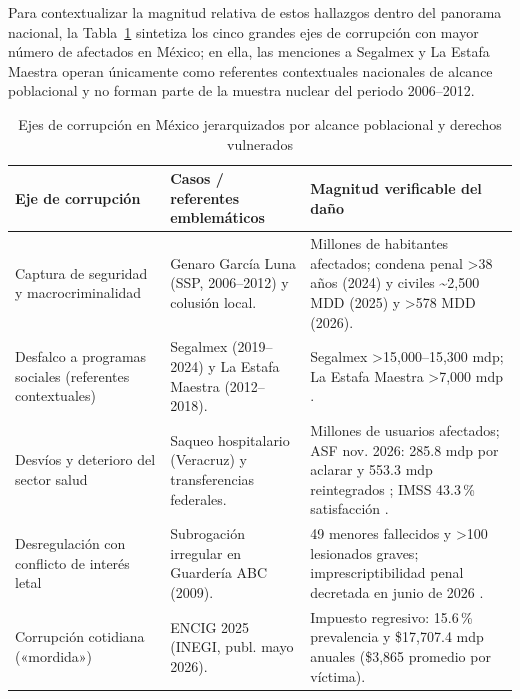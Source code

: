 \documentclass[12pt,letterpaper,oneside]{article}
\begin{document}
Para contextualizar la magnitud relativa de estos hallazgos dentro del panorama nacional, la Tabla~\ref{tab:ejes} sintetiza los cinco grandes ejes de corrupción con mayor número de afectados en México; en ella, las menciones a Segalmex y La Estafa Maestra operan únicamente como referentes contextuales nacionales de alcance poblacional y no forman parte de la muestra nuclear del periodo 2006--2012.

\begin{table}[H]
\centering
\caption{Ejes de corrupción en México jerarquizados por alcance poblacional y derechos vulnerados}
\label{tab:ejes}
\small
\begin{tabular}{@{}p{3.5cm}p{4cm}p{5.5cm}@{}}
\toprule
\textbf{Eje de corrupción} & \textbf{Casos / referentes emblemáticos} & \textbf{Magnitud verificable del daño} \\
\midrule
Captura de seguridad y macrocriminalidad & Genaro García Luna (SSP, 2006--2012) y colusión local. & Millones de habitantes afectados; condena penal >38 años (2024) y civiles \textasciitilde2,500 MDD (2025) y >578 MDD (2026). \\
\addlinespace
Desfalco a programas sociales (referentes contextuales) & Segalmex (2019--2024) y La Estafa Maestra (2012--2018). & Segalmex >15,000--15,300 mdp; La Estafa Maestra >7,000 mdp \citep{perez2024,mccitablero}. \\
\addlinespace
Desvíos y deterioro del sector salud & Saqueo hospitalario (Veracruz) y transferencias federales. & Millones de usuarios afectados; ASF nov. 2026: 285.8 mdp por aclarar y 553.3 mdp reintegrados \citep{ramos2026}; IMSS 43.3\,\% satisfacción \citep{inegi2026}. \\
\addlinespace
Desregulación con conflicto de interés letal & Subrogación irregular en Guardería ABC (2009). & 49 menores fallecidos y >100 lesionados graves; imprescriptibilidad penal decretada en junio de 2026 \citep{nunez2026}. \\
\addlinespace
Corrupción cotidiana («mordida») & ENCIG 2025 (INEGI, publ. mayo 2026). & Impuesto regresivo: 15.6\,\% prevalencia y \$17,707.4 mdp anuales (\$3,865 promedio por víctima). \\
\bottomrule
\end{tabular}
\end{table}

\clearpage

\end{document}
